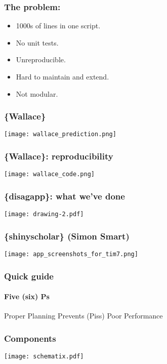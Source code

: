 \documentclass[handout, aspectratio = 169, xcolor={dvipsnames}]{beamer}
\begin{document}
\begin{frame}
\frametitle{The problem:}

\begin{itemize}
\item 1000s of lines in one script.
\item No unit tests.
\item Unreproducible.
\item Hard to maintain and extend.
\item Not modular.
\end{itemize}

\end{frame} 








\begin{frame}
\frametitle{\{Wallace\}}
\texttt{[image: wallace\_prediction.png]}

\end{frame} 


\begin{frame}
\frametitle{\{Wallace\}: reproducibility}
\texttt{[image: wallace\_code.png]}

\end{frame} 


\begin{frame}
\frametitle{\{disagapp\}: what we've done}
\texttt{[image: drawing-2.pdf]}

\end{frame} 




\begin{frame}
\frametitle{\{shinyscholar\} (Simon Smart)}
\texttt{[image: app\_screenshots\_for\_tim7.png]}
\end{frame} 




\begin{frame}
\frametitle{Quick guide}
\framesubtitle{Five (six) Ps}

Proper Planning Prevents (Piss) Poor Performance


\end{frame} 


\begin{frame}
\frametitle{Components}
\texttt{[image: schematix.pdf]}
\end{frame} 
\end{document}
